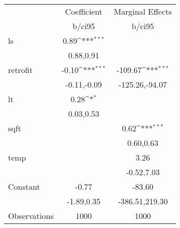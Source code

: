 {
\def\sym#1{\ifmmode^{#1}\else\(^{#1}\)\fi}
\begin{tabular}{l*{2}{c}}
\hline\hline
                    &\multicolumn{1}{c}{Coefficient}&\multicolumn{1}{c}{Marginal Effects}\\
                    &      b/ci95         &      b/ci95         \\
\hline
ls                  &        0.89\sym{***}&                     \\
                    &   0.88,0.91         &                     \\
retrofit            &       -0.10\sym{***}&     -109.67\sym{***}\\
                    & -0.11,-0.09         &-125.26,-94.07         \\
lt                  &        0.28\sym{*}  &                     \\
                    &   0.03,0.53         &                     \\
sqft                &                     &        0.62\sym{***}\\
                    &                     &   0.60,0.63         \\
temp                &                     &        3.26         \\
                    &                     &  -0.52,7.03         \\
Constant            &       -0.77         &      -83.60         \\
                    &  -1.89,0.35         &-386.51,219.30         \\
\hline
Observations        &        1000         &        1000         \\
\hline\hline
\end{tabular}
}
